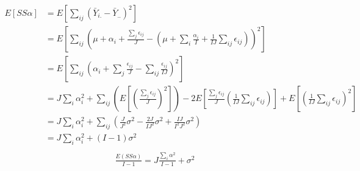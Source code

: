 \documentclass[a4paper]{article}
\begin{document}
\begin{align*}
	E[SS\alpha] & = E[\sum_{ij}(\bar Y_{i.} - \bar Y_{..})^2]\\
				& = E[\sum_{ij}(\mu + \alpha_i + \frac{\sum_j \epsilon_{ij}}{J}
				-(\mu + \sum_{i} \frac{\alpha_i}{I} + \frac{1}{IJ} \sum_{ij} \epsilon_{ij}))^2]\\
				& = E[\sum_{ij}(\alpha_i + \sum_j \frac{\epsilon_{ij}}{J} - \sum_{ij} \frac{\epsilon_{ij}}{IJ})^2]\\
				& = J \sum_i \alpha_i^2 + \sum_{ij}(E[(\frac{\sum_j \epsilon_{ij}}{J})^2])
				-2 E[\frac{\sum_j \epsilon_{ij}}{J} (\frac{1}{IJ} \sum_{ij}\epsilon_{ij})] +E[(\frac{1}{IJ}\sum_{ij} \epsilon_{ij})^2]\\
				& = J \sum_{i} \alpha^2_{i} + \sum_{ij} (\frac{J}{J^2} \sigma^2 - \frac{2J}{IJ^2} \sigma^2 + \frac{IJ}{I^2J^2} \sigma^2)\\
				& = J \sum_{i} \alpha^2_{i} + (I-1)\sigma^2 \\
\end{align*}
\begin{align*}
	\frac{E(SS\alpha)}{I-1} = J \frac{\sum_i \alpha^2}{I-1} + \sigma^2\\
\end{align*}
\end{document}
